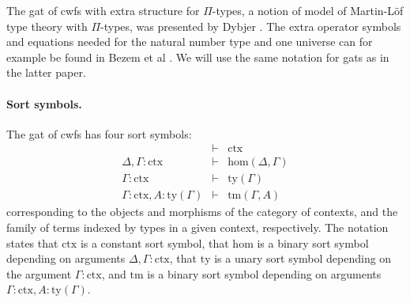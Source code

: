 \documentclass[11pt,a4paper]{article}
\theoremstyle{plain}
\theoremstyle{definition}
\def\sub{\mathrm{hom}}
\newcommand{\ctx}{\mathrm{ctx}}
\newcommand{\ty}{\mathrm{ty}}
\newcommand{\tm}{\mathrm{tm}}
\begin{document}
The gat of cwfs with extra structure for $\Pi$-types, a notion of model of Martin-Löf type theory with $\Pi$-types, was presented by Dybjer \cite{dybjer:torino}. The extra operator symbols and equations needed for the natural number type and one universe can for example be found in Bezem et al \cite{bezem:hofmann}. We will use the same notation for gats as in the latter paper.

\paragraph{Sort symbols.}
The gat of cwfs has four sort symbols:
\begin{eqnarray*}
&\vdash& \ctx\\
\Delta, \Gamma : \ctx&\vdash& \sub(\Delta,\Gamma)\\
\Gamma : \ctx&\vdash& \ty(\Gamma)\\
\Gamma : \ctx, A : \ty(\Gamma)&\vdash& \tm(\Gamma,A)
\end{eqnarray*}
corresponding to the objects and morphisms of the category of contexts, and the family of terms indexed by types in a given context, respectively. The notation states that $\ctx$ is a constant sort symbol, that $\sub$ is a binary sort symbol depending on arguments $\Delta, \Gamma : \ctx$, that $\ty$ is a unary sort symbol depending on the argument $\Gamma : \ctx$, and $\tm$ is a binary sort symbol depending on arguments $\Gamma : \ctx, A : \ty(\Gamma)$.
\end{document}
